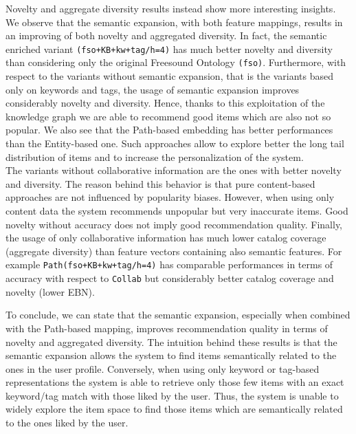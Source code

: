 Novelty and aggregate diversity results instead show more interesting insights. We observe that the semantic expansion, with both feature mappings, results in an improving of both novelty and aggregated diversity. In fact, the semantic enriched variant \texttt{(fso+KB+kw+tag/h=4)} has much better novelty and diversity than considering only the original Freesound Ontology \texttt{(fso)}. Furthermore, with respect to the variants without semantic expansion, that is the variants based only on keywords and tags, the usage of semantic expansion improves considerably novelty and diversity. Hence, thanks to this exploitation of the knowledge graph we are able to recommend good items which are also not so popular. We also see that the Path-based embedding has better performances than the Entity-based one. 
Such approaches allow to explore better the long tail distribution of items and to increase the personalization of the system. 
\\The variants without collaborative information are the ones with better novelty and diversity. The reason behind this behavior is that pure content-based approaches are not influenced by popularity biases. However, when using only content data the system recommends unpopular but very inaccurate items. Good novelty without accuracy does not imply good recommendation quality. 
Finally, the usage of only collaborative information has much lower catalog coverage (aggregate diversity) than feature vectors containing also semantic features. For example \texttt{Path(fso+KB+kw+tag/h=4)} has comparable performances in terms of accuracy with respect to \texttt{Collab} but considerably better catalog coverage and novelty (lower EBN). 

To conclude, we can state that the semantic expansion, especially when combined with the Path-based mapping, improves recommendation quality in terms of novelty and aggregated diversity. The intuition behind these results is that the semantic expansion allows the system to find items semantically related to the ones in the user profile. Conversely, when using only keyword or tag-based representations the system is able to retrieve only those few items with an exact keyword/tag match with those liked by the user. Thus, the system is unable to widely explore the item space to find those items which are semantically related to the ones liked by the user.
